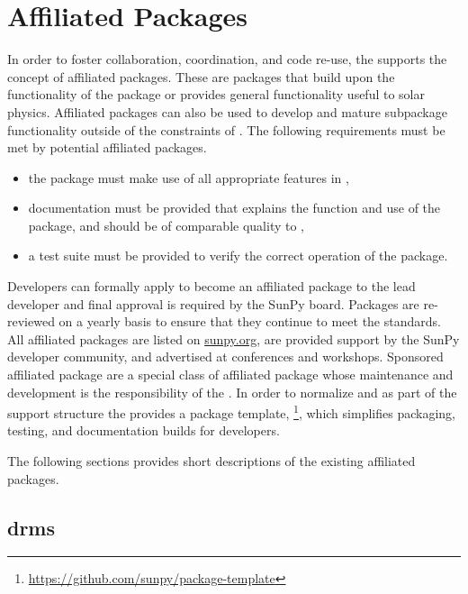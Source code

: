 \section{Affiliated Packages}
\label{sec:affil_package}

In order to foster collaboration, coordination, and code re-use, the \sunpyproj supports the concept of affiliated packages.
These are \python packages that build upon the functionality of the \sunpypkg package or provides general functionality useful to solar physics.
Affiliated packages can also be used to develop and mature subpackage functionality outside of the constraints of \sunpypkg.
The following requirements must be met by potential affiliated packages.
\begin{itemize}
    \item the package must make use of all appropriate features in \sunpypkg,
    \item documentation must be provided that explains the function and use of the package, and should be of comparable quality to \sunpypkg,
    \item a test suite must be provided to verify the correct operation of the package.
\end{itemize}
Developers can formally apply to become an affiliated package to the lead developer and final approval is required by the SunPy board.
Packages are re-reviewed on a yearly basis to ensure that they continue to meet the standards.
All affiliated packages are listed on \url{sunpy.org}, are provided support by the SunPy developer community, and advertised at conferences and workshops.
Sponsored affiliated package are a special class of affiliated package whose maintenance and development is the responsibility of the \sunpyproj.
In order to normalize and as part of the support structure the \sunpyproj provides a package template, \footnote{\url{https://github.com/sunpy/package-template}}, which simplifies packaging, testing, and documentation builds for developers.

The following sections provides short descriptions of the existing affiliated packages.

\subsection{drms}
\label{sec:drms}

